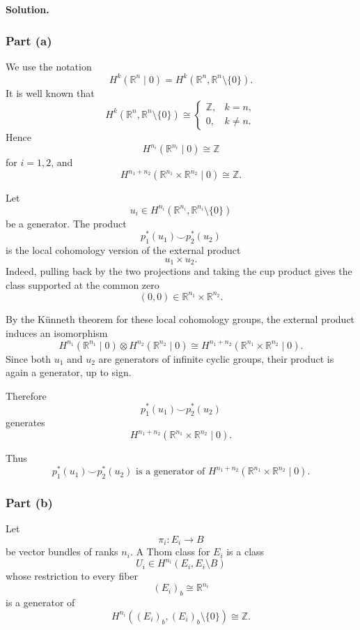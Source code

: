\documentclass[12pt,a4paper]{article}
\theoremstyle{notespace}
\begin{document}
\medskip

\noindent\textbf{Solution.}

\subsubsection*{Part (a)}

We use the notation
\[
H^k(\mathbb R^n\mid 0)
=
H^k(\mathbb R^n,\mathbb R^n\setminus\{0\}).
\]
It is well known that
\[
H^k(\mathbb R^n,\mathbb R^n\setminus\{0\})
\cong
\begin{cases}
	\mathbb Z, & k=n,\\
	0, & k\neq n.
\end{cases}
\]
Hence
\[
H^{n_i}(\mathbb R^{n_i}\mid 0)\cong \mathbb Z
\]
for \(i=1,2\), and
\[
H^{n_1+n_2}(\mathbb R^{n_1}\times \mathbb R^{n_2}\mid 0)\cong \mathbb Z.
\]

Let
\[
u_i\in H^{n_i}(\mathbb R^{n_i},\mathbb R^{n_i}\setminus\{0\})
\]
be a generator. The product
\[
p_1^*(u_1)\smile p_2^*(u_2)
\]
is the local cohomology version of the external product
\[
u_1\times u_2.
\]
Indeed, pulling back by the two projections and taking the cup product gives the
class supported at the common zero
\[
(0,0)\in \mathbb R^{n_1}\times \mathbb R^{n_2}.
\]

By the K\"unneth theorem for these local cohomology groups, the external product
induces an isomorphism
\[
H^{n_1}(\mathbb R^{n_1}\mid 0)
\otimes
H^{n_2}(\mathbb R^{n_2}\mid 0)
\cong
H^{n_1+n_2}(\mathbb R^{n_1}\times \mathbb R^{n_2}\mid 0).
\]
Since both \(u_1\) and \(u_2\) are generators of infinite cyclic groups, their
product is again a generator, up to sign.

Therefore
\[
p_1^*(u_1)\smile p_2^*(u_2)
\]
generates
\[
H^{n_1+n_2}(\mathbb R^{n_1}\times \mathbb R^{n_2}\mid 0).
\]

Thus
\[
\boxed{
	p_1^*(u_1)\smile p_2^*(u_2)
	\text{ is a generator of }
	H^{n_1+n_2}(\mathbb R^{n_1}\times \mathbb R^{n_2}\mid 0).
}
\]

\subsubsection*{Part (b)}

Let
\[
\pi_i:E_i\to B
\]
be vector bundles of ranks \(n_i\). A Thom class for \(E_i\) is a class
\[
U_i\in H^{n_i}(E_i,E_i\setminus B)
\]
whose restriction to every fiber
\[
(E_i)_b\cong \mathbb R^{n_i}
\]
is a generator of
\[
H^{n_i}((E_i)_b,(E_i)_b\setminus\{0\})
\cong \mathbb Z.
\]
\end{document}
